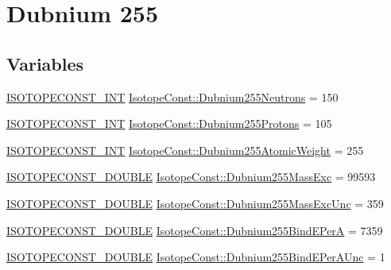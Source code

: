 \hypertarget{group___isotope_const-_dubnium-_db255}{}\section{Dubnium 255}
\label{group___isotope_const-_dubnium-_db255}
\subsection*{Variables}
\begin{DoxyCompactItemize}
\item 
\mbox{\hyperlink{group___isotope_const-_macros_ga5f18360b3e99483a35c32d789e62621c}{I\+S\+O\+T\+O\+P\+E\+C\+O\+N\+S\+T\+\_\+\+I\+NT}} \mbox{\hyperlink{group___isotope_const-_dubnium-_db255_gaed7e9bbb1d0110d5764a45b06928574f}{Isotope\+Const\+::\+Dubnium255\+Neutrons}} = 150
\item 
\mbox{\hyperlink{group___isotope_const-_macros_ga5f18360b3e99483a35c32d789e62621c}{I\+S\+O\+T\+O\+P\+E\+C\+O\+N\+S\+T\+\_\+\+I\+NT}} \mbox{\hyperlink{group___isotope_const-_dubnium-_db255_ga660df72a242becc70e20d71b0749aafc}{Isotope\+Const\+::\+Dubnium255\+Protons}} = 105
\item 
\mbox{\hyperlink{group___isotope_const-_macros_ga5f18360b3e99483a35c32d789e62621c}{I\+S\+O\+T\+O\+P\+E\+C\+O\+N\+S\+T\+\_\+\+I\+NT}} \mbox{\hyperlink{group___isotope_const-_dubnium-_db255_ga0187cf4184652f99e44c1b95c1b2c029}{Isotope\+Const\+::\+Dubnium255\+Atomic\+Weight}} = 255
\item 
\mbox{\hyperlink{group___isotope_const-_macros_ga8f45a7272ce02c0b4c65c44636ed719a}{I\+S\+O\+T\+O\+P\+E\+C\+O\+N\+S\+T\+\_\+\+D\+O\+U\+B\+LE}} \mbox{\hyperlink{group___isotope_const-_dubnium-_db255_gaf1907e05a16c01104f6e488614a03292}{Isotope\+Const\+::\+Dubnium255\+Mass\+Exc}} = 99593
\item 
\mbox{\hyperlink{group___isotope_const-_macros_ga8f45a7272ce02c0b4c65c44636ed719a}{I\+S\+O\+T\+O\+P\+E\+C\+O\+N\+S\+T\+\_\+\+D\+O\+U\+B\+LE}} \mbox{\hyperlink{group___isotope_const-_dubnium-_db255_gae42f20728b198722eabbf8a32757fcc9}{Isotope\+Const\+::\+Dubnium255\+Mass\+Exc\+Unc}} = 359
\item 
\mbox{\hyperlink{group___isotope_const-_macros_ga8f45a7272ce02c0b4c65c44636ed719a}{I\+S\+O\+T\+O\+P\+E\+C\+O\+N\+S\+T\+\_\+\+D\+O\+U\+B\+LE}} \mbox{\hyperlink{group___isotope_const-_dubnium-_db255_gaa15f01602878340d355da467c35de48d}{Isotope\+Const\+::\+Dubnium255\+Bind\+E\+PerA}} = 7359
\item 
\mbox{\hyperlink{group___isotope_const-_macros_ga8f45a7272ce02c0b4c65c44636ed719a}{I\+S\+O\+T\+O\+P\+E\+C\+O\+N\+S\+T\+\_\+\+D\+O\+U\+B\+LE}} \mbox{\hyperlink{group___isotope_const-_dubnium-_db255_ga0941a2dd5a8c29c63038afe2bc7f8b86}{Isotope\+Const\+::\+Dubnium255\+Bind\+E\+Per\+A\+Unc}} = 1

\end{DoxyCompactItemize}
